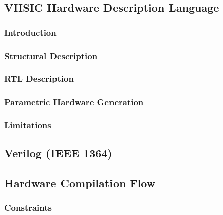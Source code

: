 \subsection{VHSIC Hardware Description Language}
\label{vhdl}

\subsubsection{Introduction}
\label{vhdl:introduction}

\subsubsection{Structural Description}
\label{vhdl:structuralDescription}

\subsubsection{RTL Description}
\label{vhdl:rtlDescription}

\subsubsection{Parametric Hardware Generation}
\label{vhdl:parametricHardwareGeneration}

\subsubsection{Limitations}
\label{vhdl:limitations}

\subsection{Verilog (IEEE 1364)}
\label{verilog}

\subsection{Hardware Compilation Flow}
\label{hardwareCompilationFlow}

\subsubsection{Constraints}
\label{hardwareCompilationFlow:constraints}
